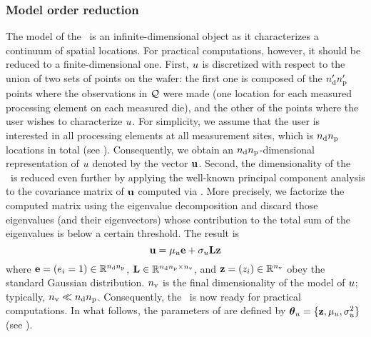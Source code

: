 \subsubsection{Model order reduction} 
The model of the \qoi\ is an infinite-dimensional object as it characterizes a continuum of spatial locations.
For practical computations, however, it should be reduced to a finite-dimensional one.
First, $u$ is discretized with respect to the union of two sets of points on the wafer: the first one is composed of the ${n_\text{d}'} {n_\text{p}'}$ points where the observations in $\mathcal{Q}$ were made (one location for each measured processing element on each measured die), and the other of the points where the user wishes to characterize $u$.
For simplicity, we assume that the user is interested in all processing elements at all measurement sites, which is ${n_\text{d}} {n_\text{p}}$ locations in total (see ).
Consequently, we obtain an ${n_\text{d}} {n_\text{p}}$-dimensional representation of $u$ denoted by the vector $\mathbf{u}$.
Second, the dimensionality of the \qoi\ is reduced even further by applying the well-known principal component analysis to the covariance matrix of $\mathbf{u}$ computed via .
More precisely, we factorize the computed matrix using the eigenvalue decomposition \cite{press2007} and discard those eigenvalues (and their eigenvectors) whose contribution to the total sum of the eigenvalues is below a certain threshold.
The result is
\begin{equation} \elabel{kl-approximation}
  \vu = \mu_\u \vOne + \sigma_\u \mKL \vz
\end{equation}
where $\mathbf{e} = (e_i = 1) \in \mathbb{R}^{{n_\text{d}} {n_\text{p}}}$, $\mathbf{L} \in \mathbb{R}^{{n_\text{d}} {n_\text{p}} \times {n_\text{v}}}$, and $\mathbf{z} = (z_i) \in \mathbb{R}^{n_\text{v}}$ obey the standard Gaussian distribution.
${n_\text{v}}$ is the final dimensionality of the model of $u$; typically, ${n_\text{v}} \ll {n_\text{d}} {n_\text{p}}$.
Consequently, the \qoi\ is now ready for practical computations.
In what follows, the parameters of  are defined by ${\boldsymbol\theta}_u = \{ \mathbf{z}, \mu_u, \sigma^2_u \}$ (see ).

